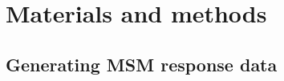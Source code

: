 \documentclass{article}
\begin{document}



\section{Materials and methods}

\subsection{Generating MSM response data}
\end{document}

